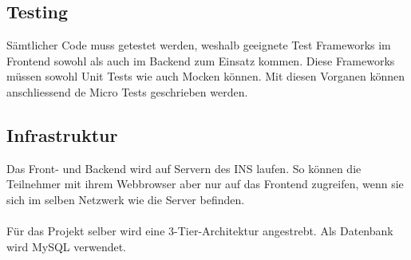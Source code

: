 \subsection{Testing}
Sämtlicher Code muss getestet werden, weshalb geeignete Test Frameworks im Frontend sowohl als auch im Backend zum Einsatz kommen. Diese Frameworks müssen sowohl Unit Tests wie auch Mocken können. Mit diesen Vorganen können anschliessend de Micro Tests geschrieben werden.

\subsection{Infrastruktur}
Das Front- und Backend wird auf Servern des INS laufen. So können die Teilnehmer mit ihrem Webbrowser aber nur auf das Frontend zugreifen, wenn sie sich im selben Netzwerk wie die Server befinden.
\\
\\
Für das Projekt selber wird eine 3-Tier-Architektur angestrebt. Als Datenbank wird  \mbox{MySQL} verwendet.

\newpage